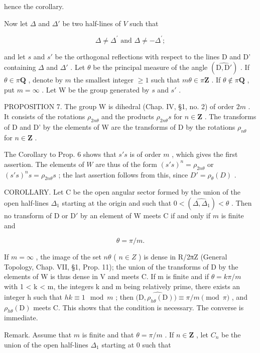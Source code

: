 hence the corollary.

Now let \(\Delta\) and \(\Delta'\) be two half-lines of \(V\) such that

\[
\Delta \neq \Delta^ {\prime} \text { and } \Delta \neq - \Delta^ {\prime};
\]

and let \(s\) and \(s'\) be the orthogonal reflections with respect to the lines D and D' containing \(\Delta\) and \(\Delta'\) . Let \(\theta\) be the principal measure of the angle \((\widehat{\mathrm{D},\mathrm{D}'})\) . If \(\theta \in \pi\mathbf{Q}\) , denote by \(m\) the smallest integer \(\geqslant 1\) such that \(m\theta \in \pi\mathbf{Z}\) . If \(\theta \notin \pi\mathbf{Q}\) , put \(m = \infty\) . Let W be the group generated by \(s\) and \(s'\) .

PROPOSITION 7. The group W is dihedral (Chap. IV, §1, no. 2) of order \(2m\) . It consists of the rotations \(\rho_{2n\theta}\) and the products \(\rho_{2n\theta}s\) for \(n \in \mathbf{Z}\) . The transforms of D and D' by the elements of W are the transforms of D by the rotations \(\rho_{n\theta}\) for \(n \in \mathbf{Z}\) .

The Corollary to Prop. 6 shows that \(s's\) is of order \(m\) , which gives the first assertion. The elements of \(W\) are thus of the form \((s's)^n = \rho_{2n\theta}\) or \((s's)^n s = \rho_{2n\theta}s\) ; the last assertion follows from this, since \(D' = \rho_\theta(D)\) .

COROLLARY. Let C be the open angular sector formed by the union of the open half-lines \(\Delta_{1}\) starting at the origin and such that \(0 < (\widehat{\Delta, \Delta_{1}}) < \theta\) . Then no transform of D or \(\mathrm{D}'\) by an element of W meets C if and only if \(m\) is finite and

\[
\theta = \pi / m.
\]

If \(m = \infty\) , the image of the set \(n\theta\) ( \(n \in Z\) ) is dense in R/2πZ (General Topology, Chap. VII, §1, Prop. 11); the union of the transforms of D by the elements of W is thus dense in V and meets C. If m is finite and if \(\theta = k\pi/m\) with 1 \textless{} k \textless{} m, the integers k and m being relatively prime, there exists an integer h such that \(hk \equiv 1 \mod m\) ; then \((\widehat{\mathrm{D}, \rho_{h\theta}(\mathrm{D}))} \equiv \pi/m \pmod{\pi}\) , and \(\rho_{h\theta}(\mathrm{D})\) meets C. This shows that the condition is necessary. The converse is immediate.

Remark. Assume that \(m\) is finite and that \(\theta = \pi / m\) . If \(n \in \mathbf{Z}\) , let \(C_n\) be the union of the open half-lines \(\Delta_1\) starting at 0 such that

